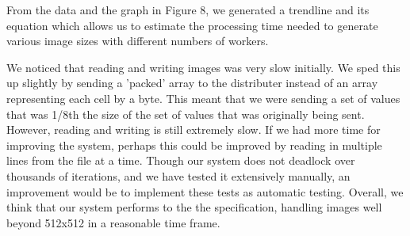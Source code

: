 \documentclass{article}
\begin{document}
\vspace{3mm}

From the data and the graph in Figure 8, we generated a trendline and its equation which allows us
to estimate the processing time needed to generate various image sizes with different numbers of
workers.

\vspace{3mm}

We noticed that reading and writing images was very slow initially. We sped this up slightly by
sending a 'packed' array to the distributer instead of an array representing each cell by a byte.
This meant that we were sending a set of values that was 1/8th the size of the set of values that
was originally being sent. However, reading and writing is still extremely slow. If we had
more time for improving the system, perhaps this could be improved by reading in multiple lines
from the file at a time. Though our system does not deadlock over thousands of iterations, and we have
tested it extensively manually, an improvement would be to implement these tests as automatic testing.
Overall, we think that our system performs to the the specification, handling images well beyond 512x512
in a reasonable time frame. 


\end{document}
